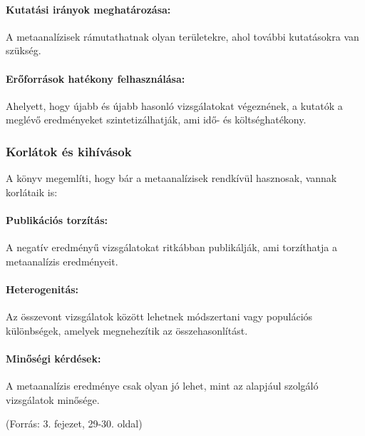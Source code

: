 \documentclass[a4paper,12pt]{article}
\begin{document}
\paragraph{Kutatási irányok meghatározása:}
A metaanalízisek rámutathatnak olyan területekre, ahol további kutatásokra van szükség.

\paragraph{Erőforrások hatékony felhasználása:}
Ahelyett, hogy újabb és újabb hasonló vizsgálatokat végeznének, a kutatók a meglévő eredményeket szintetizálhatják, ami idő- és költséghatékony.

\subsubsection{Korlátok és kihívások}
A könyv megemlíti, hogy bár a metaanalízisek rendkívül hasznosak, vannak korlátaik is:

\paragraph{Publikációs torzítás:}
A negatív eredményű vizsgálatokat ritkábban publikálják, ami torzíthatja a metaanalízis eredményeit.

\paragraph{Heterogenitás:}
Az összevont vizsgálatok között lehetnek módszertani vagy populációs különbségek, amelyek megnehezítik az összehasonlítást.

\paragraph{Minőségi kérdések:}
A metaanalízis eredménye csak olyan jó lehet, mint az alapjául szolgáló vizsgálatok minősége.

(Forrás: 3. fejezet, 29-30. oldal)

    

    
\end{document}
